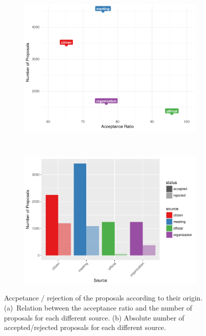 \begin{figure}[H]
    \centering
    \begin{subfigure}{0.5\textwidth}
        \centering
        \includegraphics[width=\textwidth]{Figures/source_ac.pdf}
        \caption{}
    \end{subfigure}%
    ~ 
    \begin{subfigure}{0.5\textwidth}
        \centering        
        \includegraphics[width=\textwidth]{Figures/source_hist.pdf}
        \caption{}
    \end{subfigure}
    \caption{Accpetance / rejection of the proposals according to their origin. (a)~Relation between the acceptance ratio and the number of proposals for each different source.
(b) Absolute number of accepted/rejected proposals for each different source.}
    \label{source}
\end{figure}

